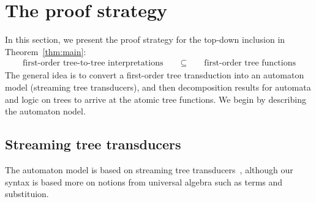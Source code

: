 \section{The proof strategy}
\label{sec:strategy}
In this section, we present the proof strategy for the top-down inclusion in Theorem~\ref{thm:main}:
\begin{align*}
    \text{first-order tree-to-tree interpretations} \qquad \subseteq \qquad \text{first-order tree functions}
\end{align*}
The general idea is to convert a first-order tree transduction into an automaton model (streaming tree transducers), and then decomposition results for automata and logic on trees to arrive at the atomic tree functions. We begin by describing the automaton nodel. 

\subsection{Streaming tree transducers}
The automaton model is based on streaming tree transducers~\cite{alur2017streaming}, although our syntax is based more on notions from universal algebra such as terms and substituion.





